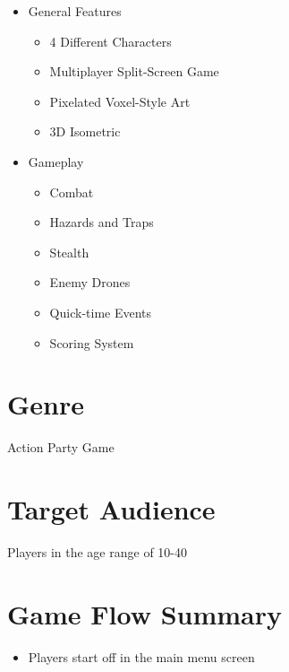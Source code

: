 \documentclass{scrreprt}
\begin{document}
\begin{itemize}
    \item General Features
    \begin{itemize}
        \item 4 Different Characters
        \item Multiplayer Split-Screen Game
        \item Pixelated Voxel-Style Art
        \item 3D Isometric
    \end{itemize}
    \item Gameplay
    \begin{itemize}
        \item Combat
        \item Hazards and Traps
        \item Stealth
        \item Enemy Drones
        \item Quick-time Events
        \item Scoring System
    \end{itemize}
\end{itemize}

\section{Genre}
Action Party Game

\section{Target Audience}
Players in the age range of 10-40

\section{Game Flow Summary}
\begin{itemize}
    \item Players start off in the main menu screen
\end{itemize}
    
\end{document}
